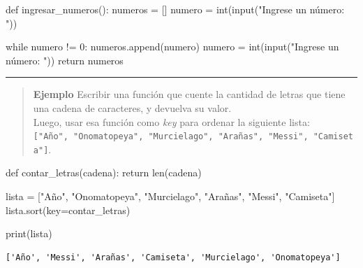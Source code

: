 \documentclass[
  letterpaper,
  DIV=11,
  numbers=noendperiod]{scrreprt}
\newenvironment{Shaded}{\begin{snugshade}}{\end{snugshade}}
\newcommand{\BuiltInTok}[1]{\textcolor[rgb]{0.00,0.23,0.31}{#1}}
\newcommand{\ControlFlowTok}[1]{\textcolor[rgb]{0.00,0.23,0.31}{#1}}
\newcommand{\DecValTok}[1]{\textcolor[rgb]{0.68,0.00,0.00}{#1}}
\newcommand{\KeywordTok}[1]{\textcolor[rgb]{0.00,0.23,0.31}{#1}}
\newcommand{\NormalTok}[1]{\textcolor[rgb]{0.00,0.23,0.31}{#1}}
\newcommand{\OperatorTok}[1]{\textcolor[rgb]{0.37,0.37,0.37}{#1}}
\newcommand{\StringTok}[1]{\textcolor[rgb]{0.13,0.47,0.30}{#1}}
\begin{document}
\begin{Shaded}
\begin{Highlighting}[]
\KeywordTok{def}\NormalTok{ ingresar\_numeros():}
\NormalTok{    numeros }\OperatorTok{=}\NormalTok{ []}
\NormalTok{    numero }\OperatorTok{=} \BuiltInTok{int}\NormalTok{(}\BuiltInTok{input}\NormalTok{(}\StringTok{"Ingrese un número: "}\NormalTok{))}

    \ControlFlowTok{while}\NormalTok{ numero }\OperatorTok{!=} \DecValTok{0}\NormalTok{:}
\NormalTok{        numeros.append(numero)}
\NormalTok{        numero }\OperatorTok{=} \BuiltInTok{int}\NormalTok{(}\BuiltInTok{input}\NormalTok{(}\StringTok{"Ingrese un número: "}\NormalTok{))}
    \ControlFlowTok{return}\NormalTok{ numeros}
\end{Highlighting}
\end{Shaded}

\hfill\break

\begin{center}\rule{0.5\linewidth}{0.5pt}\end{center}

\hfill\break

\begin{quote}
\textbf{Ejemplo} Escribir una función que cuente la cantidad de letras
que tiene una cadena de caracteres, y devuelva su valor.\\
Luego, usar esa función como \emph{key} para ordenar la siguiente lista:
\texttt{{[}"Año",\ "Onomatopeya",\ "Murcielago",\ "Arañas",\ "Messi",\ "Camiseta"{]}}.
\end{quote}

\begin{Shaded}
\begin{Highlighting}[]
\KeywordTok{def}\NormalTok{ contar\_letras(cadena):}
    \ControlFlowTok{return} \BuiltInTok{len}\NormalTok{(cadena)}

\NormalTok{lista }\OperatorTok{=}\NormalTok{ [}\StringTok{"Año"}\NormalTok{, }\StringTok{"Onomatopeya"}\NormalTok{, }\StringTok{"Murcielago"}\NormalTok{, }\StringTok{"Arañas"}\NormalTok{, }\StringTok{"Messi"}\NormalTok{, }\StringTok{"Camiseta"}\NormalTok{]}
\NormalTok{lista.sort(key}\OperatorTok{=}\NormalTok{contar\_letras)}

\BuiltInTok{print}\NormalTok{(lista)}
\end{Highlighting}
\end{Shaded}

\begin{verbatim}
['Año', 'Messi', 'Arañas', 'Camiseta', 'Murcielago', 'Onomatopeya']
\end{verbatim}
\end{document}
